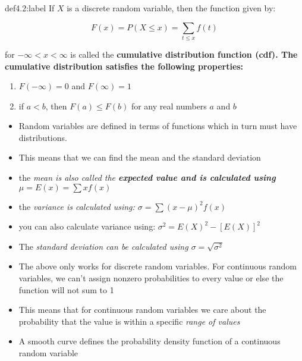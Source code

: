 \begin{definition}{def4.2:label}
    If $X$ is a discrete random variable, then the function given by:

    $$
    F(x) = P(X \le x) = \sum_{t \le x} f(t)
    $$

    for $-\infty < x < \infty$ is called the \bf{cumulative distribution function (cdf)}. The cumulative distribution satisfies the following properties:

    \begin{enumerate}
        \item $F(-\infty) = 0$ and $F(\infty) = 1$
        \item if $a < b$, then $F(a) \le F(b)$ for any real numbers $a$ and $b$
    \end{enumerate}

    \begin{itemize}
        \item Random variables are defined in terms of functions which in turn must have distributions.
        \item This means that we can find the mean and the standard deviation
        \item the \it{mean} is also called the \bf{expected value} and is calculated using $\mu = E(x) = \sum xf(x)$
        \item the \it{variance} is calculated using: $\sigma = \sum (x-\mu)^2f(x)$
        \item you can also calculate variance using: $\sigma^2 =E(X)^2 - [E(X)]^2$
        \item The \it{standard deviation} can be calculated using $\sigma = \sqrt{\sigma^2}$
    \end{itemize}
\end{definition}

    \begin{itemize}
        \item The above only works for discrete random variables. For continuous random variables, we can't assign nonzero probabilities to every value or else the function will not sum to 1
        \item This means that for continuous random variables we care about the probability that the value is within a specific \it{range of values}   
        \item A smooth curve defines the probability density function of a continuous random variable 
    \end{itemize}

